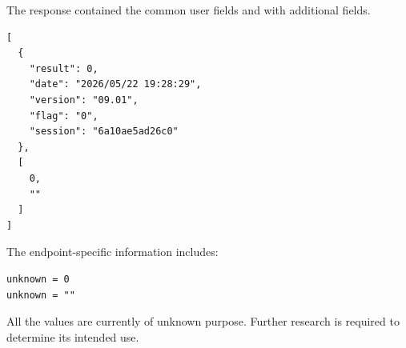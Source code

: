 The response contained the common user fields and with additional fields.

\begin{lstlisting}
[
  {
    "result": 0,
    "date": "2026/05/22 19:28:29",
    "version": "09.01",
    "flag": "0",
    "session": "6a10ae5ad26c0"
  },
  [
    0,
    ""
  ]
]
\end{lstlisting}

\newpage

The endpoint-specific information includes:

\begin{lstlisting}
unknown = 0
unknown = ""
\end{lstlisting}

\begin{tcolorbox}[colback=yellow!10,colframe=orange!80!black,title=Warning]
All the values are currently of unknown purpose.
Further research is required to determine its intended use.
\end{tcolorbox}

\newpage